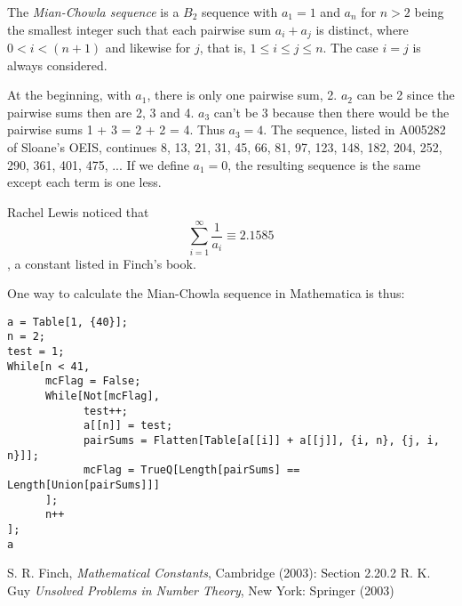 \documentclass[12pt]{article}
\begin{document}

The {\em Mian-Chowla sequence} is a $B_2$ sequence with $a_1 = 1$ and $a_n$ for $n > 2$ being the smallest integer such that each pairwise sum $a_i + a_j$ is distinct, where $0 < i < (n + 1)$ and likewise for $j$, that is, $1 \le i \le j \le n$. The case $i = j$ is always considered.

At the beginning, with $a_1$, there is only one pairwise sum, 2. $a_2$ can be 2 since the pairwise sums then are 2, 3 and 4. $a_3$ can't be 3 because then there would be the pairwise sums 1 + 3 = 2 + 2 = 4. Thus $a_3 = 4$. The sequence, listed in A005282 of Sloane's OEIS, continues 8, 13, 21, 31, 45, 66, 81, 97, 123, 148, 182, 204, 252, 290, 361, 401, 475, ... If we define $a_1 = 0$, the resulting sequence is the same except each term is one less.

Rachel Lewis noticed that $$\sum_{i = 1}^\infty \frac{1}{a_i} \equiv 2.1585$$, a constant listed in Finch's book.

One way to calculate the Mian-Chowla sequence in Mathematica is thus:

\begin{verbatim}
a = Table[1, {40}];
n = 2;
test = 1;
While[n < 41,
      mcFlag = False;
      While[Not[mcFlag], 
            test++;
            a[[n]] = test;
            pairSums = Flatten[Table[a[[i]] + a[[j]], {i, n}, {j, i, n}]];
            mcFlag = TrueQ[Length[pairSums] == Length[Union[pairSums]]]
      ];
      n++
];
a
\end{verbatim}

\begin{thebibliography}{5}
 S. R. Finch, {\it Mathematical Constants}, Cambridge (2003): Section 2.20.2
 R. K. Guy {\it Unsolved Problems in Number Theory}, New York: Springer (2003)
\end{thebibliography}
\end{document}
